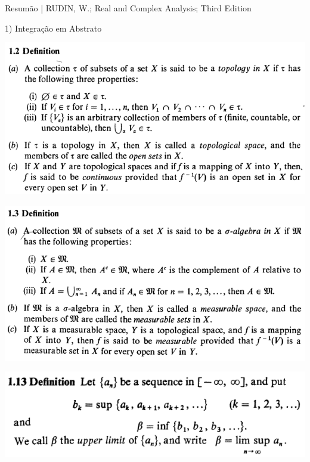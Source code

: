 \documentclass[12pt]{article}
\begin{document}
\Large

\begin{center}
Resum\~ao | RUDIN, W.; Real and Complex Analysis; Third Edition
\end{center}

\normalsize

1) Integra\c{c}\~ao em Abstrato

\vspace{3mm}

		\begin{center}
		\includegraphics{d1ponto2}
		\end{center}

		\begin{center}
		\includegraphics{d1ponto3}
		\end{center}

		\begin{center}
		\includegraphics{d1ponto13}
		\end{center}
\end{document}
